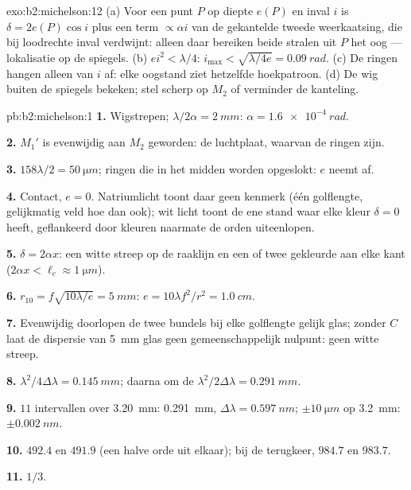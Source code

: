 \begin{solution}{exo:b2:michelson:12}
(a) Voor een punt $P$ op diepte $e(P)$ en inval $i$ is $\delta = 2e(P)\cos i$
plus een term $\propto\alpha i$ van de gekantelde tweede weerkaatsing, die
bij loodrechte inval verdwijnt: alleen daar bereiken beide stralen uit $P$
het oog --- lokalisatie op de spiegels. (b) $ei^2 < \lambda/4$:
$i_{\max} <
\sqrt{\lambda/4e} = \qty{0.09}{rad}$. (c) De ringen hangen
alleen van $i$ af: elke
oogstand ziet hetzelfde hoekpatroon. (d) De wig buiten de spiegels
bekeken; stel scherp op $M_2$ of verminder de kanteling.
\end{solution}

\begin{solution}{pb:b2:michelson:1}
\textbf{1.} Wigstrepen; $\lambda/2\alpha = \qty{2}{mm}$:
$\alpha = \qty{1.6e-4}{rad}$.

\textbf{2.} $M_1'$ is evenwijdig aan $M_2$ geworden: de luchtplaat, waarvan de
 ringen zijn.

\textbf{3.} $158\lambda/2 = \qty{50}{\micro m}$; ringen die in het midden
worden opgeslokt: $e$
neemt af.

\textbf{4.} Contact, $e = 0$. Natriumlicht toont daar geen kenmerk (één
golflengte, gelijkmatig veld hoe dan ook); wit licht toont de ene
stand waar elke kleur $\delta = 0$ heeft, geflankeerd door kleuren naarmate de
orden uiteenlopen.

\textbf{5.} $\delta = 2\alpha x$: een witte streep op de raaklijn en een of
twee gekleurde aan elke kant ($2\alpha x < \ell_c \approx \qty{1}{\micro m}$).

\textbf{6.} $r_{10} = f\sqrt{10\lambda/e} = \qty{5}{mm}$:
$e = 10\lambda f^2/r^2 = \qty{1.0}{cm}$.

\textbf{7.} Evenwijdig doorlopen de twee bundels bij elke golflengte gelijk
glas; zonder $C$ laat de dispersie van \qty{5}{mm} glas geen
gemeenschappelijk nulpunt: geen witte streep.

\textbf{8.} $\lambda^2/4\Delta\lambda = \qty{0.145}{mm}$; daarna om de
$\lambda^2/2\Delta\lambda = \qty{0.291}{mm}$.

\textbf{9.} $11$ intervallen over \qty{3.20}{mm}: \qty{0.291}{mm},
$\Delta\lambda = \qty{0.597}{nm}$;
$\pm\qty{10}{\micro m}$ op \qty{3.2}{mm}: $\pm\qty{0.002}{nm}$.

\textbf{10.} $492.4$ en $491.9$ (een halve orde uit elkaar); bij de terugkeer,
$984.7$ en $983.7$.

\textbf{11.} $1/3$.


\end{solution}
